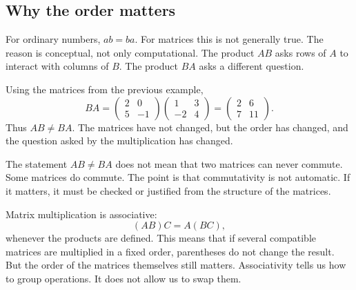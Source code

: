 \subsection*{Why the order matters}

For ordinary numbers, \(ab=ba\). For matrices this is not generally true. The reason is conceptual, not only computational. The product \(AB\) asks rows of \(A\) to interact with columns of \(B\). The product \(BA\) asks a different question.

Using the matrices from the previous example,
\[
BA=
\begin{pmatrix}2 & 0\\ 5 & -1\end{pmatrix}
\begin{pmatrix}1 & 3\\ -2 & 4\end{pmatrix}
=
\begin{pmatrix}
2 & 6\\
7 & 11
\end{pmatrix}.
\]
Thus \(AB\ne BA\). The matrices have not changed, but the order has changed, and the question asked by the multiplication has changed.

\begin{remarkbox}
The statement \(AB\ne BA\) does not mean that two matrices can never commute. Some matrices do commute. The point is that commutativity is not automatic. If it matters, it must be checked or justified from the structure of the matrices.
\end{remarkbox}

Matrix multiplication is associative:
\[
(AB)C=A(BC),
\]
whenever the products are defined. This means that if several compatible matrices are multiplied in a fixed order, parentheses do not change the result. But the order of the matrices themselves still matters. Associativity tells us how to group operations. It does not allow us to swap them.
